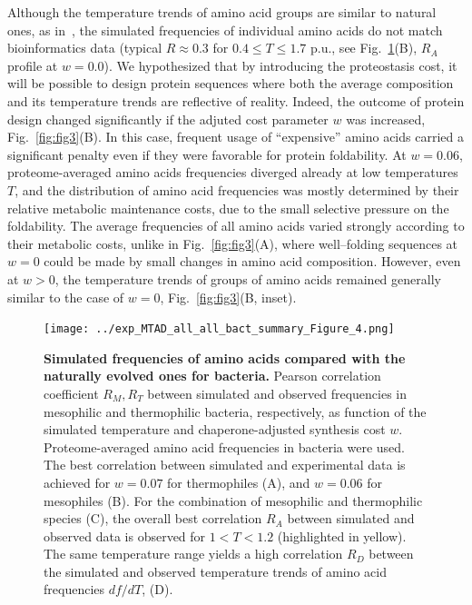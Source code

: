 \documentclass[10pt,letterpaper]{article}
\begin{document}
Although the temperature trends of amino acid groups are similar to natural ones, as in~\cite{Berezovsky2007Positive,Venev2015Massively}, the simulated frequencies of individual amino acids do not match bioinformatics data (typical $R\approx0.3$ for $0.4\leq T\leq 1.7$ p.u., see Fig.~\ref{fig:fig4}(B), $R_A$ profile at $w=0.0$). We hypothesized that by introducing the proteostasis cost, it will be possible to design protein sequences where both the average composition and its temperature trends are reflective of reality. Indeed, the outcome of protein design changed significantly if the adjuted cost parameter $w$ was increased, Fig.~\ref{fig:fig3}(B). In this case, frequent usage of ``expensive'' amino acids carried a significant penalty even if they were favorable for protein foldability. At $w=0.06$, proteome-averaged amino acids frequencies diverged already at low temperatures $T$, and the distribution of amino acid frequencies was mostly determined by their relative metabolic maintenance costs, due to the small selective pressure on the foldability. The average frequencies of all amino acids varied strongly according to their metabolic costs, unlike in Fig.~\ref{fig:fig3}(A), where well--folding sequences at $w=0$ could be made by small changes in amino acid composition. However, even at $w>0$, the temperature trends of groups of amino acids remained generally similar to the case of $w=0$, Fig.~\ref{fig:fig3}(B, inset).


\begin{figure}[h!]
\texttt{[image: ../exp\_MTAD\_all\_all\_bact\_summary\_Figure\_4.png]}
\caption{
{\bf Simulated frequencies of amino acids compared with the naturally evolved ones for bacteria.} 
Pearson correlation coefficient $R_M, R_T$ between simulated and observed frequencies in mesophilic and thermophilic bacteria, respectively, as function of the simulated temperature and chaperone-adjusted synthesis cost $w$. Proteome-averaged amino acid frequencies in bacteria were used. The best correlation between simulated and experimental data is achieved for $w=0.07$ for thermophiles (A), and $w=0.06$ for mesophiles (B). For the combination of mesophilic and thermophilic species (C), the overall best correlation $R_A$ between simulated and observed data is observed for $1<T<1.2$ (highlighted in yellow). The same temperature range yields a high correlation $R_D$ between the simulated and observed temperature trends of amino acid frequencies $df/dT$, (D).
}
\label{fig:fig4}
\end{figure}
\end{document}
